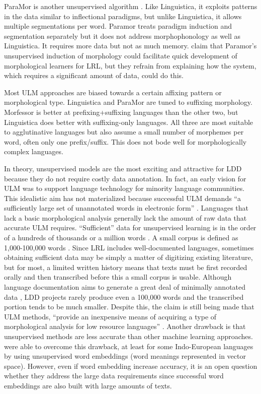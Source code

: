 \documentclass[12pt]{article}
\begin{document}
ParaMor is another unsupervised algorithm \cite{monson_unsupervised_2004,monson_paramorMinimally_2007a,monson_paramorfinding_2007b,monson_evaluating_2008}. Like Linguistica, it exploits patterns in the data similar to inflectional paradigms, but unlike Linguistica, it allows multiple segmentations per word. Paramor treats paradigm induction and segmentation separately but it does not address morphophonology as well as Linguistica. It requires more data but not as much memory.  claim that Paramor’s unsupervised induction of morphology could facilitate quick development of morphological learners for LRL, but they refrain from explaining how the system, which requires a significant amount of data, could do this.

Most ULM approaches are biased towards a certain affixing pattern or morphological type. Linguistica and ParaMor are tuned to suffixing morphology. Morfessor is better at prefixing+suffixing languages than the other two, but Linguistica does better with suffixing-only languages. All three are most suitable to agglutinative languages but also assume a small number of morphemes per word, often only one prefix/suffix. This does not bode well for morphologically complex languages. 

In theory, unsupervised models are the most exciting and attractive for LDD because they do not require costly data annotation. In fact, an early vision for ULM was to support language technology for minority language communities. This idealistic aim has not materialized because successful ULM demands ``a sufficiently large set of unannotated words in electronic form'' \cite[page 92]{ruokolainen_comparative_2016}. Languages that lack a basic morphological analysis generally lack the amount of raw data that accurate ULM requires. ``Sufficient'' data for unsupervised learning is in the order of a hundreds of thousands or a million words \cite{rocio_detection_2007}. A small corpus is defined as 1,000-100,000 words \cite{kirschenbaum_unsupervised_2012}. Since LRL includes well-documented languages, sometimes obtaining sufficient data may be simply a matter of digitizing existing literature, but for most, a limited written history means that texts must be first recorded orally and then transcribed before this a small corpus is usable. Although language documentation aims to generate a great deal of minimally annotated data \cite{himmelmann_documentary_1998,lehmann_documentation_1999}, LDD projects rarely produce even a 100,000 words and the transcribed portion tends to be much smaller.  Despite this, the claim is still being made that ULM methods, ``provide an inexpensive means of acquiring a type of morphological analysis for low resource  languages'' \cite[page 92]{ruokolainen_comparative_2016}. Another drawback is that unsupervised methods are less accurate than other machine learning approaches.  were able to overcome this drawback, at least for some Indo-European languages by using unsupervised word embeddings (word meanings represented in vector space). However, even if word embedding increase accuracy, it is an open question whether they address the large data requirements since successful word embeddings are also built with large amounts of texts. 
\end{document}
